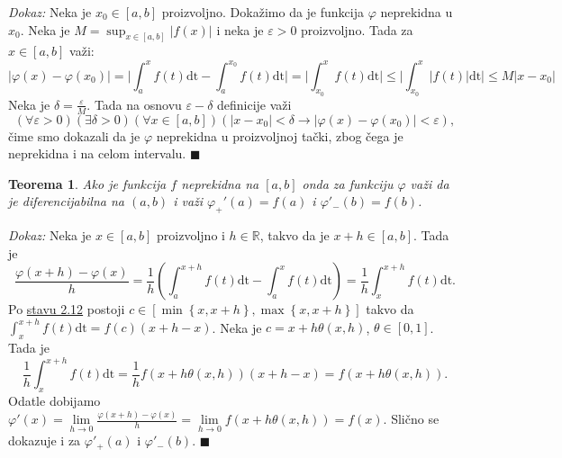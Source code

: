 \documentclass{article}
\newtheorem{teorema}{Teorema}[section]
\begin{document}
\textit{Dokaz:} Neka je $x_0 \in \left[a ,b\right]$ proizvoljno.
Dokažimo da je funkcija $\varphi$ neprekidna u $x_0$.
Neka je $M = \displaystyle \sup_{x\in\left[a,b\right]} | f\left(x\right) |$ i neka je $\varepsilon > 0$
proizvoljno. Tada za $x\in\left[a,b\right]$ važi:
\begin{equation*}
    \displaystyle |\varphi\left(x\right) - \varphi\left(x_0\right)| = \bigg|\int^x_a f\left(t\right)\text{dt} - \int^{x_0}_a f\left(t\right)\text{dt}\bigg| = \bigg|\int^x_{x_0}f\left(t\right)\text{dt}\bigg| \leq \bigg|\int^x_{x_0}|f\left(t\right)|\text{dt}\bigg| \leq M|x - x_0|
\end{equation*}
Neka je $\delta=\frac{\varepsilon}{M}$. Tada na osnovu $\varepsilon - \delta$ definicije važi
$$    \displaystyle \left(\forall \varepsilon > 0\right)\left(\exists \delta > 0\right)\left(\forall x\in \left[a, b\right]\right)\left(|x-x_0| < \delta \longrightarrow |\varphi\left(x\right) - \varphi\left(x_0\right)| < \varepsilon\right),$$
čime smo dokazali da je $\varphi$ neprekidna u proizvoljnoj tački, zbog čega je neprekidna i na celom intervalu.
\null\hfill $\blacksquare$\par

\begin{teoremabox}
    \label{teorema_2.8}
    \begin{teorema}
        Ako je funkcija $f$ neprekidna na $\left[a, b\right]$ onda za funkciju $\varphi$
        važi da je diferencijabilna na $\left(a,b\right)$ i važi $\varphi_+'\left(a\right) = f\left(a\right)$ i $\varphi'_-\left(b\right) = f\left(b\right)$.
    \end{teorema}
\end{teoremabox}

\textit{Dokaz:} Neka je $x \in \left[a, b\right]$ proizvoljno i $h \in \mathbb{R}$,
takvo da je $x+h\in\left[a,b\right]$. Tada je
$$    \frac{\varphi\left(x+h\right) - \varphi\left(x\right)}{h}  = \frac{1}{h} \left( \int^{x+h}_a f\left(t\right)\text{dt} - \int^x_a f\left(t\right)\text{dt}\right) = \frac{1}{h} \int^{x+h}_x f\left(t\right)\text{dt}.$$
Po \hyperref[stav_2.12]{stavu 2.12} postoji $c\in\left[\min\left\{x, x+h\right\}, \max\left\{x, x+h\right\}\right]$ takvo da
$\displaystyle\int^{x+h}_x f\left(t\right)\text{dt}=f\left(c\right)\left(x+h-x\right)$.
Neka je $c=x+h\theta\left(x,h\right)$, $\theta\in\left[0,1\right]$. Tada je
$$ \frac{1}{h} \int^{x+h}_x f\left(t\right)\text{dt}=\frac{1}{h} f\left(x+h\theta\left(x,h\right)\right)\left(x+h-x\right)=f\left(x+h\theta\left(x,h\right)\right).$$
Odatle dobijamo $\displaystyle \varphi'\left(x\right) =\lim\limits_{h\longrightarrow 0}\frac{\varphi\left(x+h\right) - \varphi\left(x\right)}{h} = \lim\limits_{h\longrightarrow 0} f\left(x+h\theta\left(x, h\right)\right)= f\left(x\right)$.
Slično se dokazuje i za $\varphi'_+\left(a\right)$ i $\varphi'_-\left(b\right)$.
\null\hfill $\blacksquare$\par
\end{document}
